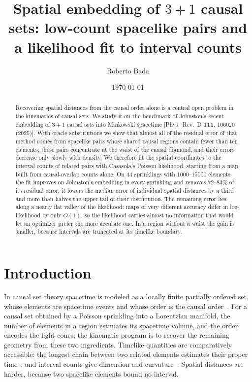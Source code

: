 \documentclass[prd,twocolumn,superscriptaddress,nofootinbib,amsmath,amssymb,floatfix]{revtex4-2}
\begin{document}
\title{Spatial embedding of $3+1$ causal sets: low-count spacelike pairs and a likelihood fit to interval counts}

\author{Roberto Bada}

\date{\today}

\begin{abstract}
Recovering spatial distances from the causal order alone is a central open problem in the kinematics of causal sets. We study it on the benchmark of Johnston's recent embedding of $3+1$ causal sets into Minkowski spacetime [Phys.\ Rev.\ D \textbf{111}, 106020 (2025)]. With oracle substitutions we show that almost all of the residual error of that method comes from spacelike pairs whose shared causal regions contain fewer than ten elements; these pairs concentrate at the waist of the causal diamond, and their errors decrease only slowly with density. We therefore fit the spatial coordinates to the interval counts of related pairs with Casasola's Poisson likelihood, starting from a map built from causal-overlap counts alone. On $44$ sprinklings with $1000$--$15000$ elements the fit improves on Johnston's embedding in every sprinkling and removes $72$--$83\%$ of its residual error; it lowers the median error of individual spatial distances by a third and more than halves the upper tail of their distribution. The remaining error lies along a nearly flat valley of the likelihood: maps of very different accuracy differ in log-likelihood by only $O(1)$, so the likelihood carries almost no information that would let an optimizer prefer the more accurate one. In a region without a waist the gain is smaller, because intervals are truncated at its timelike boundary.
\end{abstract}

\maketitle

\section{Introduction}\label{sec:intro}
In causal set theory spacetime is modeled as a locally finite partially ordered set, whose elements are spacetime events and whose order is the causal order~\cite{BLMS87,Surya19}. For a causal set obtained by a Poisson sprinkling into a Lorentzian manifold, the number of elements in a region estimates its spacetime volume, and the order encodes the light cones; the kinematic program is to recover the remaining geometry from these two ingredients. Timelike quantities are comparatively accessible: the longest chain between two related elements estimates their proper time~\cite{BrightwellGregory91}, and interval counts give dimension and curvature~\cite{GlaserSurya13,RSS13,BD10}. Spatial distances are harder, because two spacelike elements bound no interval.
\end{document}
